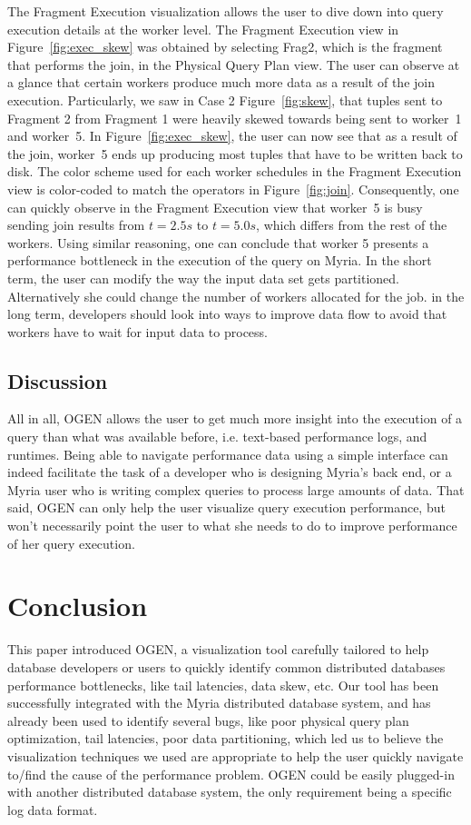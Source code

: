 \documentclass{chi2009}
\newcommand*{\system}{OGEN\xspace}
\newcommand*{\graph}{Physical Query Plan\xspace}
\newcommand*{\fragment}{Fragment Execution\xspace}
\begin{document}
The \fragment visualization allows the user to dive down into query execution details at the worker level. The \fragment view in Figure~\ref{fig:exec_skew} was obtained by selecting Frag2, which is the fragment that performs the join, in the \graph view. The user can observe at a glance that certain workers produce much more data as a result of the join execution. Particularly, we saw in Case 2 Figure~\ref{fig:skew}, that tuples sent to Fragment 2 from Fragment 1 were heavily skewed towards being sent to worker~1 and worker~5. In Figure~\ref{fig:exec_skew}, the user can now see that as a result of the join, worker~5 ends up producing most tuples that have to be written back to disk. The color scheme used for each worker schedules in the \fragment view is color-coded to match the operators in Figure~\ref{fig:join}. Consequently, one can quickly observe in the \fragment view that worker~5 is busy sending join results from $t = 2.5s$ to $t = 5.0s$, which differs from the rest of the workers. Using similar reasoning, one can conclude that worker 5 presents a performance bottleneck in the execution of the query on Myria. In the short term, the user can modify the way the input data set gets partitioned. Alternatively she could change the number of workers allocated for the job. in the long term, developers should look into ways to improve data flow to avoid that workers have to wait for input data to process.

\subsection{Discussion}

All in all, \system allows the user to get much more insight into the execution of a query than what was available before, i.e. text-based performance logs, and runtimes. Being able to navigate performance data using a simple interface can indeed facilitate the task of a developer who is designing Myria's back end, or a Myria user who is writing complex queries to process large amounts of data. That said, \system can only help the user visualize query execution performance, but won't necessarily point the user to what she needs to do to improve performance of her query execution.


\section{Conclusion}


This paper introduced \system, a visualization tool carefully tailored to help
database developers or users to quickly identify common distributed databases
performance bottlenecks, like tail latencies, data skew, etc. Our tool has been
successfully integrated with the Myria distributed database system, and has already
been used to identify several bugs, like poor physical query plan optimization,
tail latencies, poor data partitioning, which led us to believe the
visualization techniques we used are appropriate to help the user quickly
navigate to/find the cause of the performance problem. \system could be easily
plugged-in with another distributed database system, the only requirement being
a specific log data format.
\end{document}
